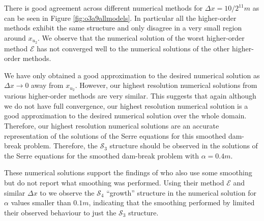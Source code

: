 \documentclass[times]{elsarticle}
\providecommand{\DIFdelbegin}{} %
\begin{document}
There is good agreement across different numerical methods for $\Delta x = 10/2^{11}m$ as can be seen in Figure \ref{fig:o3a9allmodels}. In particular all the higher-order methods exhibit the same structure and only disagree in a very small region around $x_{u_2}$. We observe that the numerical solution of the worst higher-order method $\mathcal{E}$ has not converged well to the numerical solutions of the other higher-order methods. 

We have only obtained a good approximation to the desired numerical solution as $\Delta x \rightarrow 0$ away from $x_{u_2}$. However, our highest resolution numerical solutions from various higher-order methods are very similar. This suggests that again although we do not have full convergence, our highest resolution numerical solution is a good approximation to the desired numerical solution over the whole domain. Therefore, our highest resolution numerical solutions are an accurate representation of the solutions of the Serre equations for this smoothed dam-break problem. Therefore, the $\mathcal{S}_3$ structure should be observed in the solutions of the Serre equations for the smoothed dam-break problem with $\alpha = 0.4m$.

These numerical solutions support the findings of \citet{El-etal-2006} who also use some smoothing \cite{El-Hoefer-2016-11} but do not report what smoothing was performed. Using their method $\mathcal{E}$ and similar $\Delta x$ to \citet{El-etal-2006} we observe the $\mathcal{S}_4$ ``growth'' structure in the numerical solution for $\alpha$ values smaller than $0.1m$, indicating that the smoothing performed by \citet{El-etal-2006} limited their observed behaviour to just the $\mathcal{S}_3$ structure. 
\DIFdelbegin %
\end{document}

